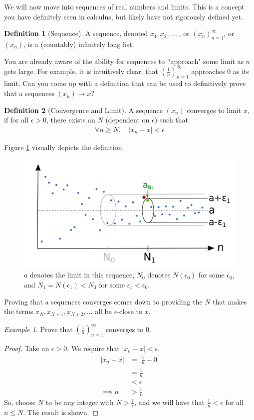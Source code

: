\documentclass[11pt]{article}
\theoremstyle{plain}
\theoremstyle{definition}
\newtheorem{defi}{Definition}[section]
\theoremstyle{remark}
\newtheorem{exm}{Example}[section]
\begin{document}
We will now move into sequences of real numbers and limits. This is a concept you have definitely seen in calculus, but likely have not rigorously defined yet.
\begin{defi}[Sequence]
    A sequence, denoted $x_1, x_2, ..., $, or $(x_n)_{n=1}^\infty$, or $(x_n)$, is a (countably) infinitely long list.
\end{defi}
You are already aware of the ability for sequences to ``approach" some limit as $n$ gets large. For example, it is intuitively clear, that $(\frac{1}{n})_{n=1}^\infty$ approaches 0 as its limit. Can you come up with a definition that can be used to definitively prove that a sequences $(x_n) \rightarrow x$?
\begin{defi}[Convergence and Limit]
    A sequence $(x_n)$ converges to limit $x$, if for all $\epsilon > 0$, there exists an $N$ (dependent on $\epsilon$) such that
    \begin{align*}
        \forall n \geq N, \quad |x_n - x| < \epsilon 
    \end{align*}
\end{defi}
Figure \ref{fig:conv} visually depicts the definition.
\begin{figure}
    \centering
    \includegraphics[width=\linewidth]{figures/limit.png}
    \caption{$a$ denotes the limit in this sequence, $N_0$ denotes $N(\epsilon_0)$ for some $\epsilon_0$, and $N_1 = N(\epsilon_1) < N_0$ for some $\epsilon_1 < \epsilon_0$.}
    \label{fig:conv}
\end{figure}
Proving that a sequences converges comes down to providing the $N$ that makes the terms $x_N, x_{N+1}, x_{N+2}, ...$ all be $\epsilon$-close to $x$.
\begin{exm}
    Prove that $(\frac{1}{n})_{n=1}^{\infty}$ converges to 0.
    \label{exm1}
\end{exm}
\begin{proof}
    Take an $\epsilon > 0$. We require that $|x_n - x| < \epsilon$.
    \begin{align*}
        |x_n - x| &= |\frac{1}{n} - 0|\\
        &= \frac{1}{n}\\
        &< \epsilon\\
        \implies n &> \frac{1}{\epsilon}
    \end{align*}
    So, choose $N$ to be any integer with $N > \frac{1}{\epsilon}$, and we will have that $\frac{1}{n} < \epsilon$ for all $n \leq N$. The result is shown.
\end{proof}
\end{document}
